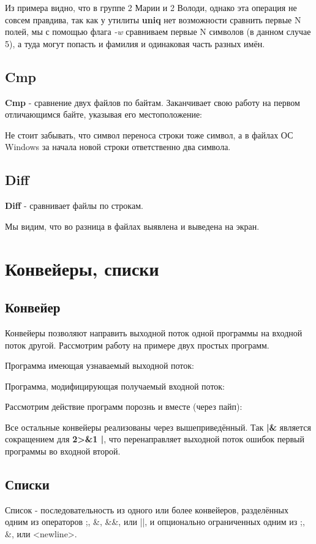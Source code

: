 \documentclass[a4paper]{article}
\begin{document}


Из примера видно, что в группе 2 Марии и 2 Володи, однако эта операция не совсем правдива, так как у утилиты \textbf{uniq} нет возможности сравнить первые N полей, мы с помощью флага \textit{-w} сравниваем первые N символов (в данном случае 5), а туда могут попасть и фамилия и одинаковая часть разных имён.
\subsection{Cmp}
\textbf{Cmp} - сравнение двух файлов по байтам. Заканчивает свою работу на первом отличающимся байте, указывая его местоположение:

Не стоит забывать, что символ переноса строки тоже символ, а в файлах ОС Windows за начала новой строки ответственно два символа.

\subsection{Diff}
\textbf{Diff} - сравнивает файлы по строкам.

Мы видим, что во разница в файлах выявлена и выведена на экран.

 
\section{Конвейеры, списки}
\subsection{Конвейер}
Конвейеры позволяют направить выходной поток одной программы на входной поток другой. Рассмотрим работу на примере двух простых программ.

Программа имеющая узнаваемый выходной поток:


Программа, модифицирующая получаемый входной поток:


Рассмотрим действие программ порознь и вместе (через пайп):


Все остальные конвейеры реализованы через вышеприведённый. Так \textbf{|\&} является сокращением для \textbf{2>\&1 |}, что перенаправляет выходной поток ошибок первый программы во входной второй.

\subsection{Списки}
Список - последовательность из одного или более конвейеров, разделённых одним из операторов ;, \&, \&\&, или ||, и опционально ограниченных одним из ;, \&, или <newline>.
\end{document}
